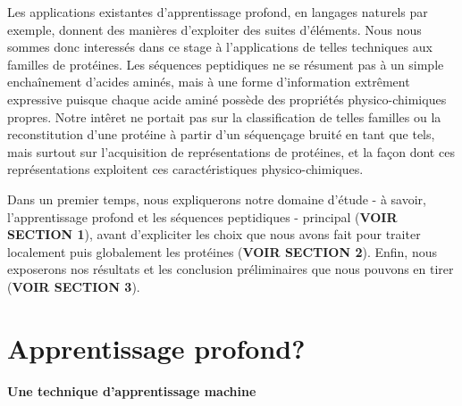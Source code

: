 \documentclass[a4paper, 11pt, onecolumn]{article}
\begin{document}
Les applications existantes d'apprentissage profond, en langages naturels par
exemple, donnent des manières d'exploiter des suites d'éléments.
Nous nous sommes donc interessés dans ce stage à l'applications de telles techniques
aux familles de protéines. Les séquences peptidiques ne se résument pas à un
simple enchaînement d'acides aminés, mais à une forme d'information extrêment
expressive puisque chaque acide aminé possède des propriétés physico-chimiques
propres. Notre intêret ne portait pas sur la
classification de telles familles ou la reconstitution d'une protéine à partir
d'un séquençage bruité en tant que tels, mais surtout sur l'acquisition de
représentations de protéines, et la façon dont ces représentations exploitent
ces caractéristiques physico-chimiques.

Dans un premier temps, nous expliquerons notre domaine d'étude - à savoir,
l'apprentissage profond et les séquences peptidiques - principal (\textbf{VOIR
  SECTION 1}), avant d'expliciter les choix que nous avons fait pour traiter
localement puis globalement les protéines (\textbf{VOIR SECTION 2}). Enfin, nous
exposerons nos résultats et les conclusion préliminaires que nous pouvons en
tirer (\textbf{VOIR SECTION 3}).


\section{Apprentissage profond?}

\paragraph{Une technique d'apprentissage machine}
\end{document}
